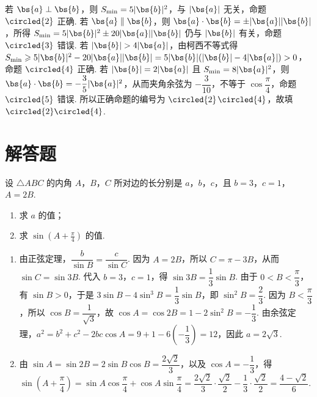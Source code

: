 \begin{problem}
\begin{solution}
若 \(\bs{a}\perp\bs{b}\)，则 \(S_{\min}=5\lvert\bs{b}\rvert^{2}\)，与 \(\lvert\bs{a}\rvert\) 无关，命题 \(\circled{2}\) 正确. 若 \(\bs{a}\parallel\bs{b}\)，则 \(\bs{a}\cdot\bs{b}=\pm\lvert\bs{a}\rvert\lvert\bs{b}\rvert\)，所得 \(S_{\min}=5\lvert\bs{b}\rvert^{2}\pm20\lvert\bs{a}\rvert\lvert\bs{b}\rvert\) 仍与 \(\lvert\bs{b}\rvert\) 有关，命题 \(\circled{3}\) 错误. 若 \(\lvert\bs{b}\rvert>4\lvert\bs{a}\rvert\)，由柯西不等式得 \(S_{\min}\geqslant5\lvert\bs{b}\rvert^{2}-20\lvert\bs{a}\rvert\lvert\bs{b}\rvert=5\lvert\bs{b}\rvert(\lvert\bs{b}\rvert-4\lvert\bs{a}\rvert)>0\)，命题 \(\circled{4}\) 正确. 若 \(\lvert\bs{b}\rvert=2\lvert\bs{a}\rvert\) 且 \(S_{\min}=8\lvert\bs{a}\rvert^{2}\)，则 \(\bs{a}\cdot\bs{b}=-\dfrac35\lvert\bs{a}\rvert^{2}\)，从而夹角余弦为 \(-\dfrac{3}{10}\)，不等于 \(\cos\dfrac{\pi}{4}\)，命题 \(\circled{5}\) 错误. 所以正确命题的编号为 \(\circled{2}\)\(\circled{4}\)，故填 \(\circled{2}\circled{4}\).
\end{solution}
\end{problem}

\section{解答题}

\begin{problem}
设 \(\triangle ABC\) 的内角 \(A\)，\(B\)，\(C\) 所对边的长分别是 \(a\)，\(b\)，\(c\)，且 \(b = 3\)，\(c = 1\)，\(A = 2B\).

\begin{enumerate}
\item 求 \(a\) 的值；
\item 求 \(\sin\left(A+\frac{\pi}{4}\right)\) 的值.
\end{enumerate}
\end{problem}

\begin{solution}
\begin{enumerate}
\item 由正弦定理，\(\dfrac{b}{\sin B}=\dfrac{c}{\sin C}\). 因为 \(A=2B\)，所以 \(C=\pi-3B\)，从而 \(\sin C=\sin 3B\). 代入 \(b=3\)，\(c=1\)，得 \(\sin 3B=\dfrac{1}{3}\sin B\). 由于 \(0<B<\dfrac{\pi}{3}\)，有 \(\sin B>0\)，于是 \(3\sin B-4\sin^{3}B=\dfrac{1}{3}\sin B\)，即 \(\sin^{2}B=\dfrac{2}{3}\). 因为 \(B<\dfrac{\pi}{3}\)，所以 \(\cos B=\dfrac{1}{\sqrt{3}}\)，故 \(\cos A=\cos 2B=1-2\sin^{2}B=-\dfrac{1}{3}\). 由余弦定理，\(a^{2}=b^{2}+c^{2}-2bc\cos A=9+1-6\left(-\dfrac{1}{3}\right)=12\)，因此 \(a=2\sqrt{3}\).
\item 由 \(\sin A=\sin 2B=2\sin B\cos B=\dfrac{2\sqrt{2}}{3}\)，以及 \(\cos A=-\dfrac{1}{3}\)，得 \(\sin\left(A+\dfrac{\pi}{4}\right)=\sin A\cos\dfrac{\pi}{4}+\cos A\sin\dfrac{\pi}{4}=\dfrac{2\sqrt{2}}{3}\cdot\dfrac{\sqrt{2}}{2}-\dfrac{1}{3}\cdot\dfrac{\sqrt{2}}{2}=\dfrac{4-\sqrt{2}}{6}\).
\end{enumerate}
\end{solution}


